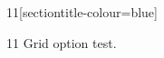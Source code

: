 \documentclass[paper=A4]{ropas-poster}
\begin{document}
\begin{postergrid}{1}{1}[sectiontitle-colour=blue]
\begin{posterblock}{1}{1}
Grid option test.
\end{posterblock}
\end{postergrid}
\end{document}
